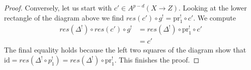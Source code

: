 \documentclass{amsart}
\theoremstyle{plain}
\theoremstyle{definition}
\theoremstyle{remark}
\numberwithin{equation}{subsection}
\begin{document}
\begin{proof}
\medskip\noindent
Conversely, let us start with $c' \in A^{p - d}(X \to Z)$. Looking
at the lower rectangle of the diagram above we find
$res(c') \circ g^! = \text{pr}_1^! \circ c'$.
We compute
\begin{align*}
res(\Delta^!) \circ res(c') \circ g^!
& =
res(\Delta^!) \circ \text{pr}_1^! \circ c' \\
& =
c'
\end{align*}
The final equality holds because the left two squares of
the diagram show that
$\text{id} = res(\Delta^! \circ p_1^!) = res(\Delta^!) \circ \text{pr}_1^!$.
This finishes the proof.
\end{proof}
\end{document}
